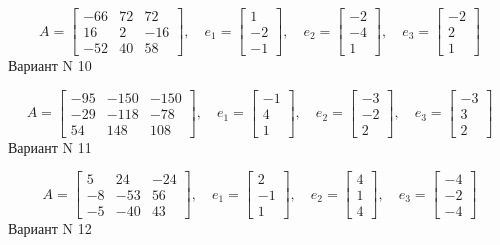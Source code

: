 \documentclass[11pt]{report}
\begin{document}
$$A = \left[\begin{matrix}-66 & 72 & 72\\16 & 2 & -16\\-52 & 40 & 58\end{matrix}\right],\quad e_1 = \left[\begin{matrix}1\\-2\\-1\end{matrix}\right],\quad e_2 = \left[\begin{matrix}-2\\-4\\1\end{matrix}\right],\quad e_3 = \left[\begin{matrix}-2\\2\\1\end{matrix}\right]$$Вариант N 10

$$A = \left[\begin{matrix}-95 & -150 & -150\\-29 & -118 & -78\\54 & 148 & 108\end{matrix}\right],\quad e_1 = \left[\begin{matrix}-1\\4\\1\end{matrix}\right],\quad e_2 = \left[\begin{matrix}-3\\-2\\2\end{matrix}\right],\quad e_3 = \left[\begin{matrix}-3\\3\\2\end{matrix}\right]$$Вариант N 11

$$A = \left[\begin{matrix}5 & 24 & -24\\-8 & -53 & 56\\-5 & -40 & 43\end{matrix}\right],\quad e_1 = \left[\begin{matrix}2\\-1\\1\end{matrix}\right],\quad e_2 = \left[\begin{matrix}4\\1\\4\end{matrix}\right],\quad e_3 = \left[\begin{matrix}-4\\-2\\-4\end{matrix}\right]$$Вариант N 12
\end{document}
